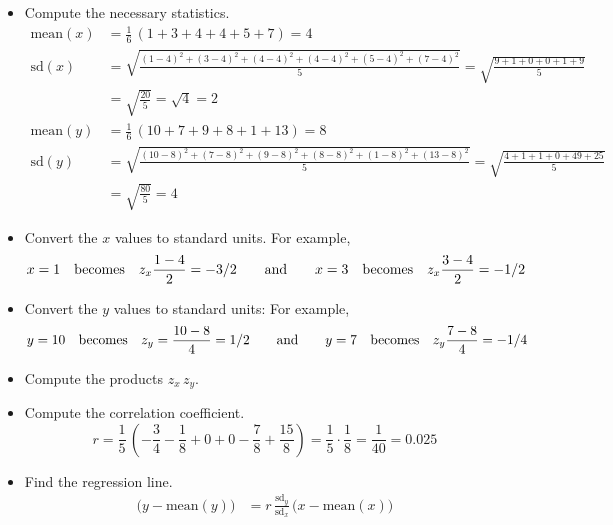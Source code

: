 \documentclass[10pt]{article}
\begin{document}
\begin{itemize}
\item  Compute the necessary statistics.
\begin{align*}
\mbox{mean}(x) & = \frac{1}{6}\,(1 + 3 + 4 + 4 + 5 + 7) = 4\\
\mbox{sd}(x)   & = \sqrt{\frac{(1-4)^2 + (3-4)^2 + (4-4)^2 + (4-4)^2 + (5-4)^2 + (7-4)^2}{5}} = 
   \sqrt{\frac{9 + 1 + 0 + 0 + 1 + 9}{5}}\\ & = \sqrt{\frac{20}{5}}=\sqrt{4} 
                =2\\
\mbox{mean}(y) &=\frac{1}{6}\,(10 + 7 + 9 + 8  + 1 + 13) = 8\\
\mbox{sd}(y)   &=\sqrt{\frac{(10-8)^2 + (7-8)^2 + (9-8)^2 + (8-8)^2 + (1-8)^2 + (13-8)^2}{5}}
     = \sqrt{\frac{4 + 1 + 1 + 0 + 49 + 25}{5}} \\ & = \sqrt{\frac{80}{5}}
     = 4
\end{align*}
\item Convert the $x$ values to standard units.  For example,
\[x = 1\mbox{\hspace{10pt}becomes\hspace{10pt}} z_x\frac{1-4}{2} = -3/2
\mbox{\hspace{20pt}and\hspace{20pt}}
x = 3\mbox{\hspace{10pt}becomes\hspace{10pt}} z_x\frac{3-4}{2} = -1/2\]
\item Convert the $y$ values to standard units:
For example,
\[y=10\mbox{\hspace{10pt}becomes\hspace{10pt}} z_y=\frac{10-8}{4} = 1/2
\mbox{\hspace{20pt}and\hspace{20pt}}
y=7\mbox{\hspace{10pt}becomes\hspace{10pt}}  z_y\frac{7-8}{4} = -1/4\]
\item Compute the products $z_x\,z_y$.
\item Compute the correlation coefficient.
\[r = \frac{1}{5}\,\left(-\frac{3}{4} - \frac{1}{8} + 0 + 0 - \frac{7}{8} + \frac{15}{8}\right)
  = \frac{1}{5}\cdot\frac{1}{8} = \frac{1}{40}=0.025\]
%
\item Find the regression line.\vspace{-15pt}
\begin{align*}
\big(y-\mbox{mean}(y)\big) &= r\,\frac{\mbox{sd}_y}{\mbox{sd}_x}\,
   \big(x-\mbox{mean}(x)\big)\\

\end{align*}
\end{itemize}
\end{document}
